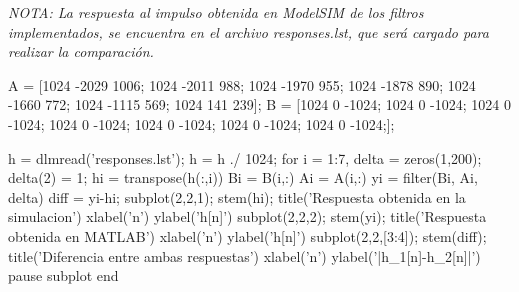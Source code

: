 \documentclass[a4paper,12pt]{article}
\begin{document}
\emph{NOTA: La respuesta al impulso obtenida en ModelSIM de los filtros implementados, se encuentra en el archivo responses.lst, que será cargado para realizar la comparación.}

\begin{matlabcode}

A = [1024 -2029 1006;
    1024 -2011 988;
    1024 -1970 955;
    1024 -1878 890;
    1024 -1660 772;
    1024 -1115 569;
    1024 141 239];
B = [1024 0 -1024;
    1024 0 -1024;
    1024 0 -1024;
    1024 0 -1024;
    1024 0 -1024;
    1024 0 -1024;
    1024 0 -1024;];



h = dlmread('responses.lst');
h = h ./ 1024;
for i = 1:7,
    delta = zeros(1,200);
    delta(2) = 1;
    hi = transpose(h(:,i))
    Bi = B(i,:)
    Ai = A(i,:)
    yi = filter(Bi, Ai, delta)
    diff = yi-hi;
    subplot(2,2,1); stem(hi);
    title('Respuesta obtenida en la simulacion')
    xlabel('n')
    ylabel('h[n]')
    subplot(2,2,2); stem(yi);
    title('Respuesta obtenida en MATLAB')
    xlabel('n')
    ylabel('h[n]')
    subplot(2,2,[3:4]); stem(diff);
    title('Diferencia entre ambas respuestas')
    xlabel('n')
    ylabel('|h_1[n]-h_2[n]|')
    pause
    subplot
end

\end{matlabcode}
\clearpage
\end{document}
